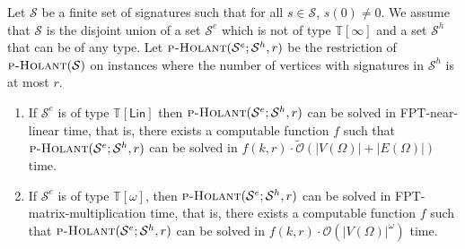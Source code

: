 \documentclass[authorcolumns,numberwithinsect]{no-lipics-v2022}
\newcommand{\holantprob}{\text{\sc{p-Holant}}}
\begin{document}
\begin{lemma}\label{lem:restrictedHolant}
Let $\mathcal{S}$ be a finite set of signatures such that for all $s \in \mathcal{S}$, $s(0) \neq 0$. We assume that $\mathcal{S}$ is the disjoint union of a set $\mathcal{S}^e$ which is not of type $\mathbb{T}[\infty]$ and a set $\mathcal{S}^h$ that can be of any type. Let $\holantprob(\mathcal{S}^e;\mathcal{S}^h, r)$ be the restriction of $\holantprob(\mathcal{S})$ on instances where the number of vertices with signatures in $\mathcal{S}^h$ is at most $r$. 
\begin{enumerate} 
\item If $\mathcal{S}^e$ is of type $\mathbb{T}[\mathsf{Lin}]$ then $\holantprob(\mathcal{S}^e;\mathcal{S}^h, r)$ can be solved in FPT-near-linear time, that is, there exists a computable function $f$ such that $\holantprob(\mathcal{S}^e;\mathcal{S}^h,r)$ can be solved in $f(k,r)\cdot\tilde{\mathcal{O}}(|V(\Omega)| + |E(\Omega)|)$ time. 
\item If $\mathcal{S}^e$ is of type $\mathbb{T}[\omega]$, then $\holantprob(\mathcal{S}^e; \mathcal{S}^h, r)$ can be solved in FPT-matrix-multiplication time, that is, there exists a computable function $f$ such that $\holantprob(\mathcal{S}^e;\mathcal{S}^h,r)$ can be solved in $f(k, r)\cdot\mathcal{O}(|V(\Omega)|^{\omega})$ time.
\end{enumerate}
\end{lemma}
\end{document}
